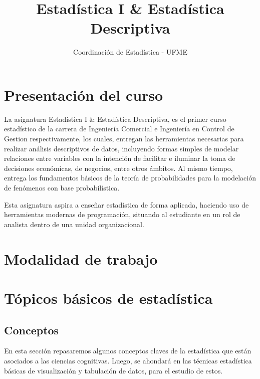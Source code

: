 \documentclass[
]{book}
\title{Estadística I \& Estadística Descriptiva}
\author{Coordinación de Estadística - UFME}
\date{}
\begin{document}
\maketitle

{
\setcounter{tocdepth}{1}
\tableofcontents
}
\hypertarget{presentaciuxf3n-del-curso}{%
\chapter*{Presentación del curso}\label{presentaciuxf3n-del-curso}}

La asignatura Estadística I \& Estadística Descriptiva, es el primer curso estadístico de la carrera de Ingeniería Comercial e Ingeniería en Control de Gestion respectivamente, los cuales, entregan las herramientas necesarias para realizar análisis descriptivos de datos, incluyendo formas simples de modelar relaciones entre variables con la intención de facilitar e iluminar la toma de decisiones económicas, de negocios, entre otros ámbitos. Al mismo tiempo, entrega los fundamentos básicos de la teoría de probabilidades para la modelación de fenómenos con base probabilística.

Esta asignatura aspira a enseñar estadística de forma aplicada, haciendo uso de herramientas modernas de programación, situando al estudiante en un rol de analista dentro de una unidad organizacional.

\hypertarget{modalidad-de-trabajo}{%
\chapter*{Modalidad de trabajo}\label{modalidad-de-trabajo}}

\hypertarget{tuxf3picos-buxe1sicos-de-estaduxedstica}{%
\chapter{Tópicos básicos de estadística}\label{tuxf3picos-buxe1sicos-de-estaduxedstica}}

\hypertarget{conceptos}{%
\section{Conceptos}\label{conceptos}}

En esta sección repasaremos algunos conceptos claves de la estadística que están asociados a las ciencias cognitivas. Luego, se ahondará en las técnicas estadística básicas de visualización y tabulación de datos, para el estudio de estos.
\end{document}
